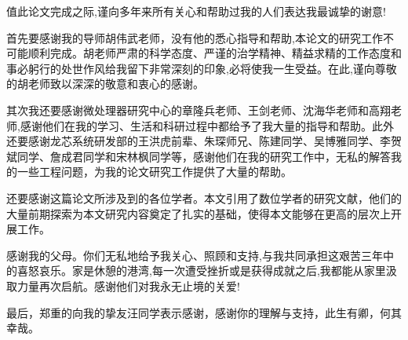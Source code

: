 
\begin{ack}
值此论文完成之际,谨向多年来所有关心和帮助过我的人们表达我最诚挚的谢意!

首先要感谢我的导师胡伟武老师，没有他的悉心指导和帮助,本论文的研究工作不可能顺利完成。胡老师严肃的科学态度、严谨的治学精神、精益求精的工作态度和事必躬行的处世作风给我留下非常深刻的印象,必将使我一生受益。在此,谨向尊敬的胡老师致以深深的敬意和衷心的感谢。

其次我还要感谢微处理器研究中心的章隆兵老师、王剑老师、沈海华老师和高翔老师,感谢他们在我的学习、生活和科研过程中都给予了我大量的指导和帮助。此外还要感谢龙芯系统研发部的王洪虎前辈、朱琛师兄、陈建同学、吴博雅同学、李贺斌同学、詹成君同学和宋林枫同学等，感谢他们在我的研究工作中，无私的解答我的一些工程问题，为我的论文研究工作提供了大量的帮助。

还要感谢这篇论文所涉及到的各位学者。本文引用了数位学者的研究文献，他们的大量前期探索为本文研究内容奠定了扎实的基础，使得本文能够在更高的层次上开展工作。

感谢我的父母。你们无私地给予我关心、照顾和支持,与我共同承担这艰苦三年中的喜怒哀乐。家是休憩的港湾,每一次遭受挫折或是获得成就之后,我都能从家里汲取力量再次启航。感谢他们对我永无止境的关爱!

最后，郑重的向我的挚友汪同学表示感谢，感谢你的理解与支持，此生有卿，何其幸哉。

\end{ack}
